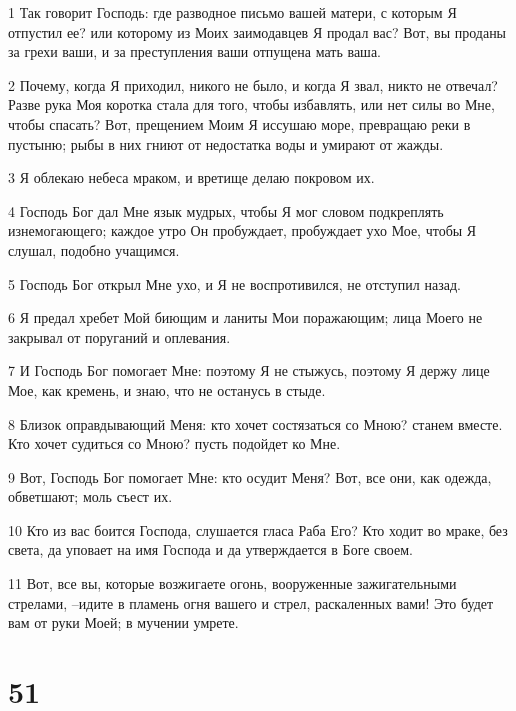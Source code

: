 \par 1 Так говорит Господь: где разводное письмо вашей матери, с которым Я отпустил ее? или которому из Моих заимодавцев Я продал вас? Вот, вы проданы за грехи ваши, и за преступления ваши отпущена мать ваша.
\par 2 Почему, когда Я приходил, никого не было, и когда Я звал, никто не отвечал? Разве рука Моя коротка стала для того, чтобы избавлять, или нет силы во Мне, чтобы спасать? Вот, прещением Моим Я иссушаю море, превращаю реки в пустыню; рыбы в них гниют от недостатка воды и умирают от жажды.
\par 3 Я облекаю небеса мраком, и вретище делаю покровом их.
\par 4 Господь Бог дал Мне язык мудрых, чтобы Я мог словом подкреплять изнемогающего; каждое утро Он пробуждает, пробуждает ухо Мое, чтобы Я слушал, подобно учащимся.
\par 5 Господь Бог открыл Мне ухо, и Я не воспротивился, не отступил назад.
\par 6 Я предал хребет Мой биющим и ланиты Мои поражающим; лица Моего не закрывал от поруганий и оплевания.
\par 7 И Господь Бог помогает Мне: поэтому Я не стыжусь, поэтому Я держу лице Мое, как кремень, и знаю, что не останусь в стыде.
\par 8 Близок оправдывающий Меня: кто хочет состязаться со Мною? станем вместе. Кто хочет судиться со Мною? пусть подойдет ко Мне.
\par 9 Вот, Господь Бог помогает Мне: кто осудит Меня? Вот, все они, как одежда, обветшают; моль съест их.
\par 10 Кто из вас боится Господа, слушается гласа Раба Его? Кто ходит во мраке, без света, да уповает на имя Господа и да утверждается в Боге своем.
\par 11 Вот, все вы, которые возжигаете огонь, вооруженные зажигательными стрелами, --идите в пламень огня вашего и стрел, раскаленных вами! Это будет вам от руки Моей; в мучении умрете.

\chapter{51}

